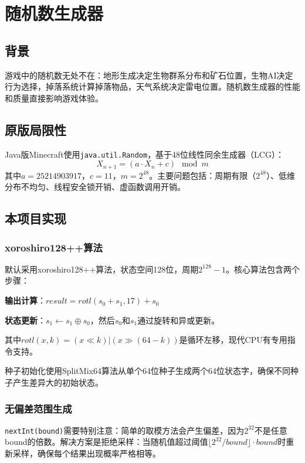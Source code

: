 \section{随机数生成器}
\label{sec:random}

\subsection{背景}

游戏中的随机数无处不在：地形生成决定生物群系分布和矿石位置，生物AI决定行为选择，掉落系统计算掉落物品，天气系统决定雷电位置。随机数生成器的性能和质量直接影响游戏体验。

\subsection{原版局限性}

Java版Minecraft使用\texttt{java.util.Random}，基于48位线性同余生成器（LCG）：
\begin{equation}
X_{n+1} = (a \cdot X_n + c) \mod m
\end{equation}
其中$a = 25214903917$，$c = 11$，$m = 2^{48}$。主要问题包括：周期有限（$2^{48}$）、低维分布不均匀、线程安全锁开销、虚函数调用开销。

\subsection{本项目实现}

\subsubsection{xoroshiro128++算法}

默认采用xoroshiro128++算法，状态空间128位，周期$2^{128}-1$。核心算法包含两个步骤：

\textbf{输出计算}：$result = rotl(s_0 + s_1, 17) + s_0$

\textbf{状态更新}：$s_1 \leftarrow s_1 \oplus s_0$，然后$s_0$和$s_1$通过旋转和异或更新。

其中$rotl(x, k) = (x \ll k) | (x \gg (64-k))$是循环左移，现代CPU有专用指令支持。

种子初始化使用SplitMix64算法从单个64位种子生成两个64位状态字，确保不同种子产生差异大的初始状态。

\subsubsection{无偏差范围生成}

\texttt{nextInt(bound)}需要特别注意：简单的取模方法会产生偏差，因为$2^{32}$不是任意bound的倍数。解决方案是拒绝采样：当随机值超过阈值$\lfloor 2^{32}/bound \rfloor \cdot bound$时重新采样，确保每个结果出现概率严格相等。

